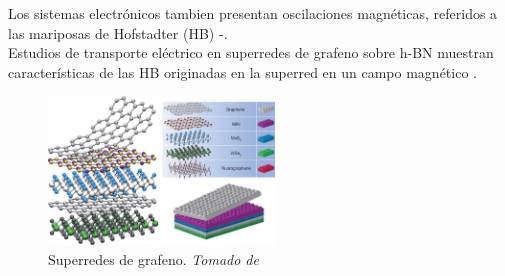 \begin{frame}
	\begin{multicols}{2}
		Los sistemas electrónicos tambien presentan oscilaciones magnéticas,
		referidos a las mariposas de Hofstadter (HB) \cite{Yu2014}-\cite{Yang2016}.\\
		\vspace{0.5cm}
		Estudios de transporte eléctrico en superredes de grafeno sobre h-BN \cite{Yankowitz2012}
		muestran características de las HB originadas en la superred en un campo magnético \cite{BenShalom2016}.
		\begin{figure}
			\includegraphics[width=6cm]{graficas/heterostructures.jpg}
			\caption{Superredes de grafeno. \textit{Tomado de} \cite{Geim2013}}
			\label{heterostructures}
		\end{figure}
	\end{multicols}
\end{frame}
